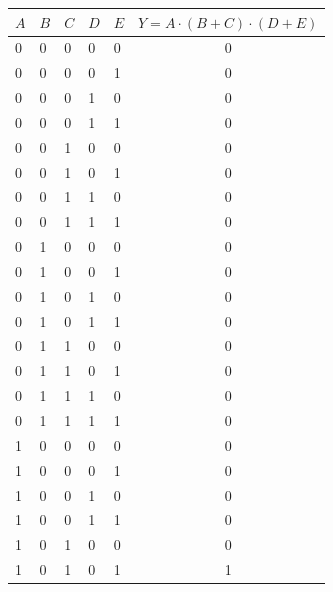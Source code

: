 \documentclass[11pt]{article}
\begin{document}
\begin{longtable}[!h]{|l|l|l|l|l|c|}
    \hline
    $A$ & $B$ & $C$ & $D$ & $E$ & $Y=A\cdot(B+C)\cdot(D+E)$ \\ \hline
    0   & 0   & 0   & 0   & 0   & 0                         \\ \hline
    0   & 0   & 0   & 0   & 1   & 0                         \\ \hline
    0   & 0   & 0   & 1   & 0   & 0                         \\ \hline
    0   & 0   & 0   & 1   & 1   & 0                         \\ \hline
    0   & 0   & 1   & 0   & 0   & 0                         \\ \hline
    0   & 0   & 1   & 0   & 1   & 0                         \\ \hline
    0   & 0   & 1   & 1   & 0   & 0                         \\ \hline
    0   & 0   & 1   & 1   & 1   & 0                         \\ \hline
    0   & 1   & 0   & 0   & 0   & 0                         \\ \hline
    0   & 1   & 0   & 0   & 1   & 0                         \\ \hline
    0   & 1   & 0   & 1   & 0   & 0                         \\ \hline
    0   & 1   & 0   & 1   & 1   & 0                         \\ \hline
    0   & 1   & 1   & 0   & 0   & 0                         \\ \hline
    0   & 1   & 1   & 0   & 1   & 0                         \\ \hline
    0   & 1   & 1   & 1   & 0   & 0                         \\ \hline
    0   & 1   & 1   & 1   & 1   & 0                         \\ \hline
    1   & 0   & 0   & 0   & 0   & 0                         \\ \hline
    1   & 0   & 0   & 0   & 1   & 0                         \\ \hline
    1   & 0   & 0   & 1   & 0   & 0                         \\ \hline
    1   & 0   & 0   & 1   & 1   & 0                         \\ \hline
    1   & 0   & 1   & 0   & 0   & 0                         \\ \hline
    1   & 0   & 1   & 0   & 1   & 1                         \\ \hline

\end{longtable}
\end{document}
